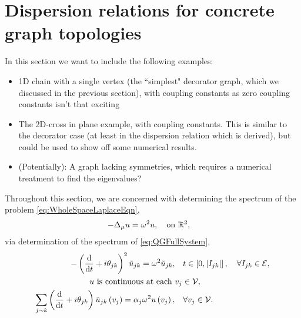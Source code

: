 \section{Dispersion relations for concrete graph topologies} \label{sec:Examples}
In this section we want to include the following examples:
\begin{itemize}
	\item 1D chain with a single vertex (the ``simplest" decorator graph, which we discussed in the previous section), with coupling constants as zero coupling constants isn't that exciting
	\item The 2D-cross in plane example, with coupling constants. This is similar to the decorator case (at least in the dispersion relation which is derived), but could be used to show off some numerical results.
	\item (Potentially): A graph lacking symmetries, which requires a numerical treatment to find the eigenvalues?
\end{itemize}

Throughout this section, we are concerned with determining the spectrum of the problem \eqref{eq:WholeSpaceLaplaceEqn},
\begin{align*}
	-\Delta_{\mu} u &= \omega^2 u, \quad\text{on } \mathbb{R}^2,
\end{align*}
via determination of the spectrum of \eqref{eq:QGFullSystem},
\begin{align*}
	-\left( \dfrac{\mathrm{d}}{\mathrm{d}t} + i\theta_{jk} \right)^2 \tilde{u}_{jk} = \omega^2 \tilde{u}_{jk}, &\quad t\in\left[ 0,\left\lvert I_{jk} \right\rvert \right], \quad \forall I_{jk}\in \mathcal{E}, \\
	u \text{ is continuous at each } &v_j \in \mathcal{V}, \\
	\sum_{j\sim k}\left( \dfrac{\mathrm{d}}{\mathrm{d}t} + i\theta_{jk} \right)\tilde{u}_{jk}\left( v_j \right) = \alpha_j\omega^2 u\left( v_j \right), &\quad \forall v_j \in \mathcal{V}.
\end{align*}

